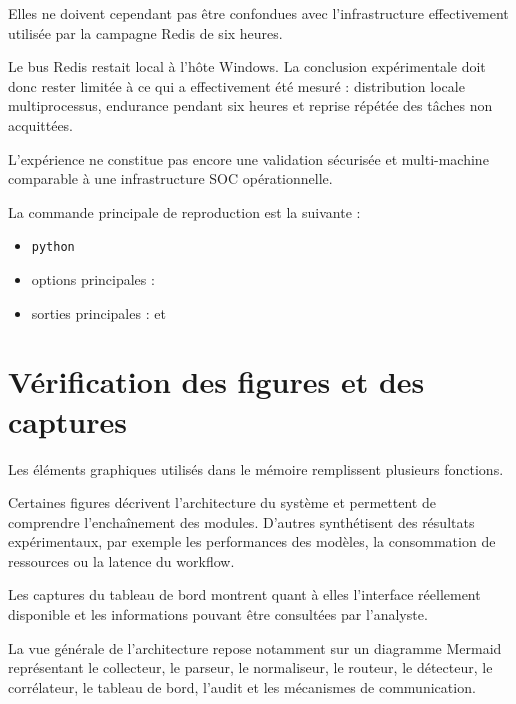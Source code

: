Elles ne doivent cependant pas être confondues avec l'infrastructure effectivement utilisée par la campagne Redis de six heures.

Le bus Redis restait local à l'hôte Windows. La conclusion expérimentale doit donc rester limitée à ce qui a effectivement été mesuré : distribution locale multiprocessus, endurance pendant six heures et reprise répétée des tâches non acquittées.

L'expérience ne constitue pas encore une validation sécurisée et multi-machine comparable à une infrastructure SOC opérationnelle.

La commande principale de reproduction est la suivante :

\begin{itemize}

\item \texttt{python} 

\item options principales :

\item sorties principales :
et

\end{itemize}

\section{Vérification des figures et des captures}

Les éléments graphiques utilisés dans le mémoire remplissent plusieurs fonctions.

Certaines figures décrivent l'architecture du système et permettent de comprendre l'enchaînement des modules. D'autres synthétisent des résultats expérimentaux, par exemple les performances des modèles, la consommation de ressources ou la latence du workflow.

Les captures du tableau de bord montrent quant à elles l'interface réellement disponible et les informations pouvant être consultées par l'analyste.

La vue générale de l'architecture repose notamment sur un diagramme Mermaid représentant le collecteur, le parseur, le normaliseur, le routeur, le détecteur, le corrélateur, le tableau de bord, l'audit et les mécanismes de communication.

